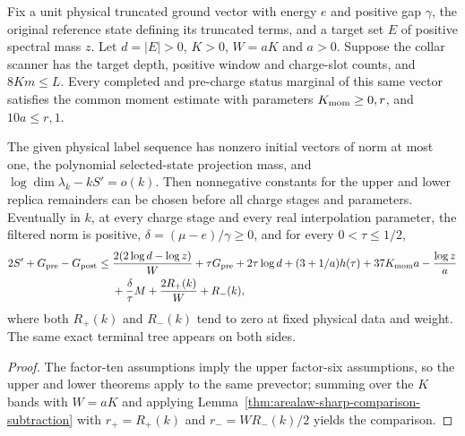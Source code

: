 \begin{lemma}
    \label{thm:arealaw-actual-sharp-comparison}
    \leanok
    Fix a unit physical truncated ground vector with energy $e$ and
    positive gap $\gamma$, the original reference state defining its
    truncated terms, and a target set $E$ of positive spectral mass $z$.
    Let $d=|E|>0$, $K>0$, $W=aK$ and $a>0$. Suppose the collar scanner
    has the target depth, positive window and charge-slot counts, and
    $8Km\le L$. Every completed and pre-charge status marginal of this
    same vector satisfies the common moment estimate with parameters
    $K_{\rm mom}\ge0,r$, and $10a\le r,1$.

    The given physical label sequence has nonzero initial vectors of
    norm at most one, the polynomial selected-state projection mass,
    and $\log\dim\lambda_k-kS'=o(k)$. Then nonnegative constants for
    the upper and lower replica remainders can be chosen before all
    charge stages and parameters. Eventually in $k$, at every
    charge stage and every real interpolation parameter, the filtered
    norm is positive, $\delta=(\mu-e)/\gamma\ge0$, and for every
    $0<\tau\le1/2$,
    \begin{align}
        2S'+G_{\rm pre}-G_{\rm post}
        \le{} & \frac{2(2\log d-\log z)}W+\tau G_{\rm pre}+2\tau\log d
        +(3+1/a)h(\tau)+37K_{\rm mom}a-\frac{\log z}a\nonumber         \\
              & +\frac\delta\tau M+\frac{2R_+(k)}W+R_-(k),
        \label{eq:arealaw-actual-sharp-comparison}
    \end{align}
    where both $R_+(k)$ and $R_-(k)$ tend to zero at fixed physical
    data and weight. The same exact terminal tree appears on both sides.
\end{lemma}
\begin{proof}
    \leanok
    The factor-ten assumptions imply the upper factor-six assumptions,
    so the upper and lower theorems apply to the same prevector;
    summing over the $K$ bands with $W=aK$ and applying
    Lemma~\ref{thm:arealaw-sharp-comparison-subtraction} with
    $r_+=R_+(k)$ and $r_-=WR_-(k)/2$ yields the comparison.
\end{proof}

